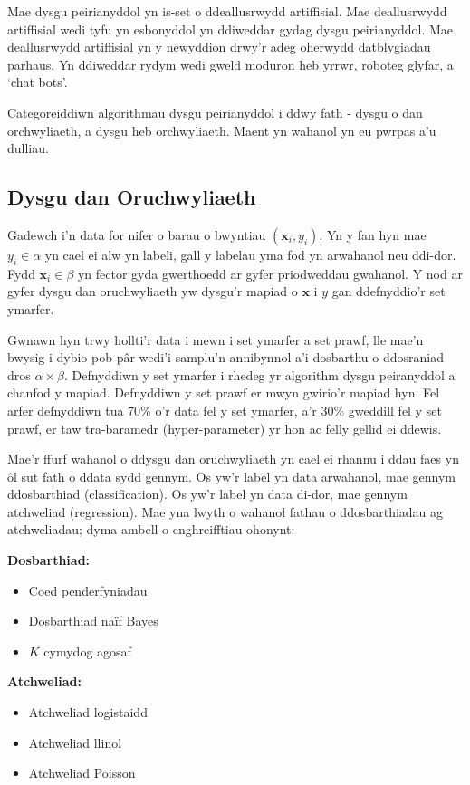 Mae dysgu peirianyddol yn is-set o ddeallusrwydd artiffisial. Mae deallusrwydd artiffisial wedi tyfu yn esbonyddol yn ddiweddar gydag dysgu peirianyddol. Mae deallusrwydd artiffisial yn y newyddion drwy'r adeg oherwydd datblygiadau parhaus. Yn ddiweddar rydym wedi gweld moduron heb yrrwr, roboteg glyfar, a `chat bots'.

Categoreiddiwn algorithmau dysgu peirianyddol i ddwy fath - dysgu o dan orchwyliaeth, a dysgu heb orchwyliaeth. Maent yn wahanol yn eu pwrpas a'u dulliau.

\subsection{Dysgu dan Oruchwyliaeth}

Gadewch i'n data for nifer o barau o bwyntiau $(\mathbf{x}_{i},y_{i})$. Yn y fan hyn mae $y_{i} \in \alpha$ yn cael ei alw yn labeli, gall y labelau yma fod yn arwahanol neu ddi-dor. Fydd $\mathbf{x}_{i} \in  \beta$ yn fector gyda gwerthoedd ar gyfer priodweddau gwahanol. Y nod ar gyfer dysgu dan oruchwyliaeth yw dysgu'r mapiad o $\mathbf{x}$ i $y$ gan ddefnyddio'r set ymarfer.\cite{dysgu-peirianyddol}

Gwnawn hyn trwy hollti'r data i mewn i set ymarfer a set prawf, lle mae'n bwysig i dybio pob p\^{a}r wedi'i samplu'n annibynnol a'i dosbarthu o ddosraniad dros $\alpha \times \beta$. Defnyddiwn y set ymarfer i rhedeg yr algorithm dysgu peiranyddol a chanfod y mapiad. Defnyddiwn y set prawf er mwyn gwirio'r mapiad hyn. Fel arfer defnyddiwn tua 70\% o'r data fel y set ymarfer, a'r 30\% gweddill fel y set prawf, er taw tra-baramedr (hyper-parameter) yr hon ac felly gellid ei ddewis.

Mae'r ffurf wahanol o ddysgu dan oruchwyliaeth yn cael ei rhannu i ddau faes yn \^{o}l sut fath o ddata sydd gennym. Os yw'r label yn data arwahanol, mae gennym ddosbarthiad (classification). Os yw'r label yn data di-dor, mae gennym atchweliad (regression). Mae yna lwyth o wahanol fathau o ddosbarthiadau ag atchweliadau; dyma ambell o enghreifftiau ohonynt:

\begin{multicols}{2}
\textbf{Dosbarthiad:}

\begin{itemize}
	\item Coed penderfyniadau
	\item Dosbarthiad na\"{i}f Bayes 
	\item $K$ cymydog agosaf
\end{itemize} 

\textbf{Atchweliad:}

\begin{itemize}
	\item Atchweliad logistaidd
	\item Atchweliad llinol
	\item Atchweliad Poisson
\end{itemize}
\end{multicols}


